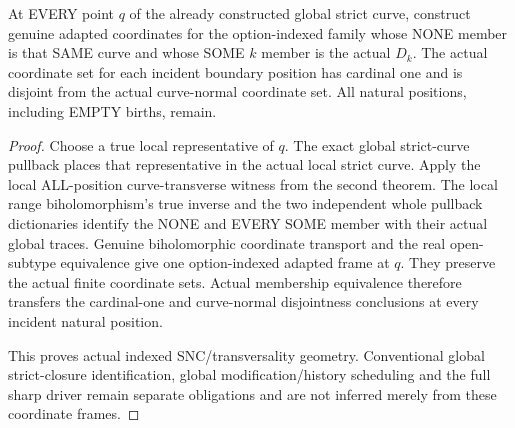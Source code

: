 \begin{theorem}
\label{hir:sharp-actual-global-indexed-boundary-curve-transverse}
\leanok
At EVERY point $q$ of the already constructed global strict curve,
construct genuine adapted coordinates for the option-indexed family
whose NONE member is that SAME curve and whose SOME $k$ member is the
actual $D_k$. The actual coordinate set for each incident boundary
position has cardinal one and is disjoint from the actual curve-normal
coordinate set. All natural positions, including EMPTY births, remain.
\end{theorem}
\begin{proof}
Choose a true local representative of $q$. The exact global strict-curve
pullback places that representative in the actual local strict curve.
Apply the local ALL-position curve-transverse witness from the second
theorem. The local range biholomorphism's true inverse and the two
independent whole pullback dictionaries identify the NONE and EVERY
SOME member with their actual global traces. Genuine biholomorphic
coordinate transport and the real open-subtype equivalence give one
option-indexed adapted frame at $q$. They preserve the actual finite
coordinate sets. Actual membership equivalence therefore transfers the
cardinal-one and curve-normal disjointness conclusions at every
incident natural position.

This proves actual indexed SNC/transversality geometry. Conventional
global strict-closure identification, global modification/history
scheduling and the full sharp driver remain separate obligations and
are not inferred merely from these coordinate frames.
\end{proof}
